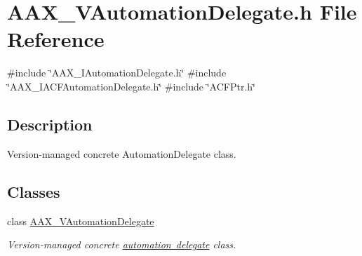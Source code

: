 \hypertarget{a00689}{}\section{A\+A\+X\+\_\+\+V\+Automation\+Delegate.\+h File Reference}
\label{a00689}
{\ttfamily \#include \char`\"{}A\+A\+X\+\_\+\+I\+Automation\+Delegate.\+h\char`\"{}}\newline
{\ttfamily \#include \char`\"{}A\+A\+X\+\_\+\+I\+A\+C\+F\+Automation\+Delegate.\+h\char`\"{}}\newline
{\ttfamily \#include \char`\"{}A\+C\+F\+Ptr.\+h\char`\"{}}\newline


\subsection{Description}
Version-\/managed concrete Automation\+Delegate class. 

\subsection*{Classes}
\begin{DoxyCompactItemize}
\item 
class \mbox{\hyperlink{a01893}{A\+A\+X\+\_\+\+V\+Automation\+Delegate}}
\begin{DoxyCompactList}\small\item\em Version-\/managed concrete \mbox{\hyperlink{a01773}{automation delegate}} class. \end{DoxyCompactList}\end{DoxyCompactItemize}
